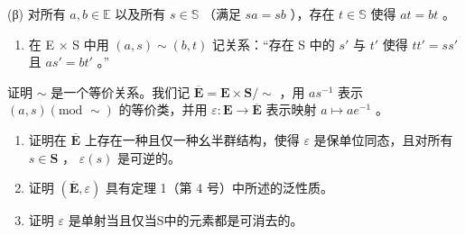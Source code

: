 (β) 对所有 \(a, b \in \mathbb{E}\) 以及所有 \(s \in \mathbb{S}\) （满足 \(sa = sb\) ），存在 \(t \in \mathbb{S}\) 使得 \(at = bt\) 。

\begin{enumerate}
\def\labelenumi{(\alph{enumi})}
\tightlist
\item
  在 E × S 中用 \((a, s) \sim (b, t)\) 记关系：“存在 S 中的 \(s'\) 与 \(t'\) 使得 \(tt' = ss'\) 且 \(as' = bt'\) 。”
\end{enumerate}

证明 \(\sim\) 是一个等价关系。我们记 \(\overline{\mathbf{E}} = \mathbf{E} \times \mathbf{S}/\sim\) ，用 \(as^{-1}\) 表示 \((a, s) (\text{mod } \sim)\) 的等价类，并用 \(\varepsilon: \mathbf{E} \to \overline{\mathbf{E}}\) 表示映射 \(a \mapsto ae^{-1}\) 。

\begin{enumerate}
\def\labelenumi{(\alph{enumi})}
\setcounter{enumi}{1}
\item
  证明在 \(\overline{\mathbf{E}}\) 上存在一种且仅一种幺半群结构，使得 \(\varepsilon\) 是保单位同态，且对所有 \(s \in \mathbf{S}\) ， \(\varepsilon(s)\) 是可逆的。
\item
  证明 \((\overline{\mathbf{E}},\varepsilon)\) 具有定理 1（第 4 号）中所述的泛性质。
\item
  证明 \(\varepsilon\) 是单射当且仅当S中的元素都是可消去的。
\end{enumerate}


